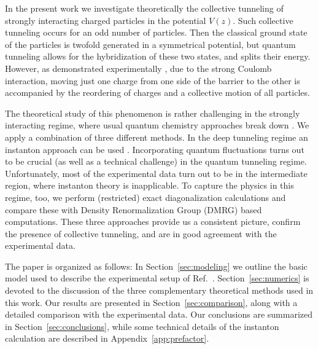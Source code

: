 \documentclass[aps, prb, floatfix, twocolumn, notitlepage, superscriptaddress, 10pt]{revtex4-2}
\newcommand{\1}{{1\hspace*{-0.5ex} \textrm{l} \hspace*{0.5ex}}}
\begin{document}



In the present work we investigate theoretically  the collective tunneling of strongly interacting charged particles 
in the potential $V(z)$. Such collective tunneling occurs for an odd number of particles. Then the classical 
ground state of the particles is twofold generated in a symmetrical potential, but quantum tunneling allows for the hybridization 
of these two states, and splits their energy. However, as demonstrated experimentally \cite{Shapir.2019}, due to 
the strong Coulomb interaction, moving just one charge from one side of the barrier to the other 
is accompanied by the reordering of charges and a collective motion of all particles. 

The theoretical study of this phenomenon is rather challenging in the strongly interacting regime,
where usual quantum chemistry approaches break down \cite{RontaniPRB2010}.  We apply a combination of three 
different methods. In the deep tunneling regime an instanton approach can be used \cite{Milnikov.2001}. Incorporating 
quantum fluctuations turns out to be crucial  (as well as a technical challenge)  in the quantum tunneling regime. 
Unfortunately, most of the experimental data turn out to be in the intermediate region, where instanton theory is inapplicable. 
To capture the physics in this  regime, too, we perform (restricted)  exact diagonalization calculations and compare these with 
Density Renormalization Group (DMRG) based computations. These three approaches provide us a 
consistent  picture, confirm the presence of collective tunneling, and are in good agreement 
 with the experimental data.

 The paper is organized as follows: In Section~\ref{sec:modeling} we outline the 
basic model used to describe the experimental setup of Ref.~\cite{Shapir.2019}. 
 Section~\ref{sec:numerics} is devoted to the  discussion of the three complementary theoretical methods used in this work.
Our results are presented in Section~\ref{sec:comparison}, along with a detailed comparison with 
 the experimental data. Our conclusions are summarized  in Section~\ref{sec:conclusions}, while  some technical details of the 
 instanton calculation are described in  Appendix~\ref{app:prefactor}.
\end{document}
